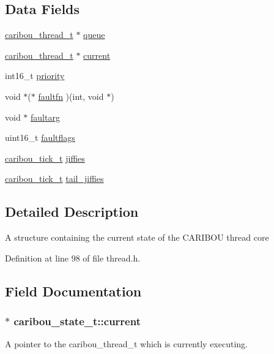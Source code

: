\subsection*{Data Fields}
\begin{DoxyCompactItemize}
\item 
\hyperlink{thread_8h_a0e341ab77bd872b9b57b065b0f8e9a8e}{caribou\-\_\-thread\-\_\-t} $\ast$ \hyperlink{structcaribou__state__t_a56f11edf4f1af20e0dbada89e7682ef7}{queue}
\item 
\hyperlink{thread_8h_a0e341ab77bd872b9b57b065b0f8e9a8e}{caribou\-\_\-thread\-\_\-t} $\ast$ \hyperlink{structcaribou__state__t_aa448a3ad9005b7e66e1232b57e00f375}{current}
\item 
int16\-\_\-t \hyperlink{structcaribou__state__t_a946baa831ec2072be75decdc41338a6c}{priority}
\item 
void $\ast$($\ast$ \hyperlink{structcaribou__state__t_a74f0e2518d9d8dac1107da05351493a4}{faultfn} )(int, void $\ast$)
\item 
void $\ast$ \hyperlink{structcaribou__state__t_a216a949f12587c830b1a6a032a55e5f6}{faultarg}
\item 
uint16\-\_\-t \hyperlink{structcaribou__state__t_addd3bea9a3b8f1c0ce07b9d5d911bcf3}{faultflags}
\item 
\hyperlink{timer_8h_a905a26361b93888fedb5a0bf658e50e8}{caribou\-\_\-tick\-\_\-t} \hyperlink{structcaribou__state__t_a8673fbc4d5b87740ee1b42c88af3278a}{jiffies}
\item 
\hyperlink{timer_8h_a905a26361b93888fedb5a0bf658e50e8}{caribou\-\_\-tick\-\_\-t} \hyperlink{structcaribou__state__t_a7bf6d1d467345264fe4f3bebe00acb25}{tail\-\_\-jiffies}
\end{DoxyCompactItemize}


\subsection{Detailed Description}
A structure containing the current state of the C\-A\-R\-I\-B\-O\-U thread core 

Definition at line 98 of file thread.\-h.



\subsection{Field Documentation}
\hypertarget{structcaribou__state__t_aa448a3ad9005b7e66e1232b57e00f375}{
\subsubsection[{current}]{$\ast$ caribou\-\_\-state\-\_\-t\-::current}}\label{structcaribou__state__t_aa448a3ad9005b7e66e1232b57e00f375}
A pointer to the caribou\-\_\-thread\-\_\-t which is currently executing. 

